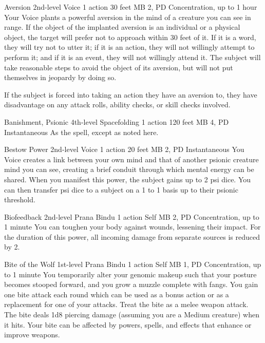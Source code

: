 \DndPowerHeader%
  {Aversion}
  {2nd-level Voice}
  {1 action}
  {30 feet}
  {MB 2, PD \lvltwo}
  {Concentration, up to 1 hour}
Your Voice plants a powerful aversion in the mind of
a creature you can see in range.
If the object of the implanted aversion is an individual
or a physical object,
the target will prefer not to approach within 30 feet of it.
If it is a word,
they will try not to utter it;
if it is an action,
they will not willingly attempt to perform it;
and if it is an event,
they will not willingly attend it.
The subject will take reasonable steps to avoid the object of its aversion,
but will not put themselves in jeopardy by doing so.

If the subject is forced into taking an action they have an aversion to,
they have disadvantage on any attack rolls,
ability checks,
or skill checks involved.

\DndPowerHeader%
  {Banishment, Psionic}
  {4th-level Spacefolding}
  {1 action}
  {120 feet}
  {MB 4, PD \lvlfour}
  {Instantaneous}
As the  spell, except as noted here.

\DndPowerHeader%
  {Bestow Power}
  {2nd-level Voice}
  {1 action}
  {20 feet}
  {MB 2, PD \lvltwo}
  {Instantaneous}
You Voice creates a link between your own mind
and that of another psionic creature mind you can see,
creating a brief conduit
through which mental energy can be shared.
When you manifest this power,
the subject gains up to 2 psi dice.
You can then transfer psi dice to a subject
on a 1 to 1 basis up to their psionic threshold.

\DndPowerHeader%
  {Biofeedback}
  {2nd-level Prana Bindu}
  {1 action}
  {Self}
  {MB 2, PD \lvltwo}
  {Concentration, up to 1 minute}
    You can toughen your body against wounds,
    lessening their impact.
    For the duration of this power, all incoming damage
    from separate sources is reduced by 2.

\DndPowerHeader%
  {Bite of the Wolf}
  {1st-level Prana Bindu}
  {1 action}
  {Self}
  {MB 1, PD \lvlone}
  {Concentration, up to 1 minute}
  You temporarily alter your genomic makeup
  such that your posture becomes stooped forward,
  and you grow a muzzle complete with fangs.
  You gain one bite attack each round which
  can be used as a bonus action or as a replacement
  for one of your attacks.
  Treat the bite as a melee weapon attack.
  The bite deals 1d8 piercing damage
  (assuming you are a Medium creature)
  when it hits.
  Your bite can be affected by
  powers, spells, and effects
  that enhance or improve weapons.
  
